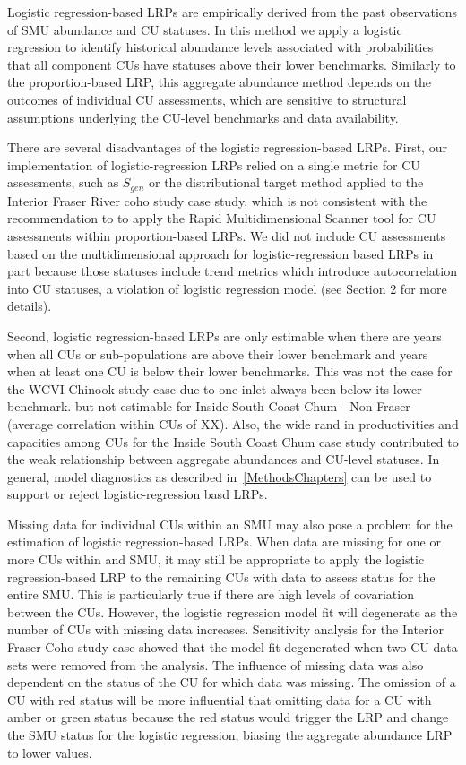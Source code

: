 \documentclass[11pt]{book}
\begin{document}
Logistic regression-based LRPs are empirically derived from the past observations of SMU abundance and CU statuses. In this method we apply a logistic regression to identify historical abundance levels associated with probabilities that all component CUs have statuses above their lower benchmarks. Similarly to the proportion-based LRP, this aggregate abundance method depends on the outcomes of individual CU assessments, which are sensitive to structural assumptions underlying the CU-level benchmarks and data availability.

There are several disadvantages of the logistic regression-based LRPs. First, our implementation of logistic-regression LRPs relied on a single metric for CU assessments, such as \(S_{gen}\) or the distributional target method applied to the Interior Fraser River coho study case study, which is not consistent with the recommendation to to apply the Rapid Multidimensional Scanner tool for CU assessments within proportion-based LRPs. We did not include CU assessments based on the multidimensional approach for logistic-regression based LRPs in part because those statuses include trend metrics which introduce autocorrelation into CU statuses, a violation of logistic regression model (see Section 2 for more details).

Second, logistic regression-based LRPs are only estimable when there are years when all CUs or sub-populations are above their lower benchmark and years when at least one CU is below their lower benchmarks. This was not the case for the WCVI Chinook study case due to one inlet always been below its lower benchmark. but not estimable for Inside South Coast Chum - Non-Fraser (average correlation within CUs of XX). Also, the wide rand in productivities and capacities among CUs for the Inside South Coast Chum case study contributed to the weak relationship between aggregate abundances and CU-level statuses. In general, model diagnostics as described in~\ref{MethodsChapters} can be used to support or reject logistic-regression basd LRPs.

Missing data for individual CUs within an SMU may also pose a problem for the estimation of logistic regression-based LRPs. When data are missing for one or more CUs within and SMU, it may still be appropriate to apply the logistic regression-based LRP to the remaining CUs with data to assess status for the entire SMU. This is particularly true if there are high levels of covariation between the CUs. However, the logistic regression model fit will degenerate as the number of CUs with missing data increases. Sensitivity analysis for the Interior Fraser Coho study case showed that the model fit degenerated when two CU data sets were removed from the analysis. The influence of missing data was also dependent on the status of the CU for which data was missing. The omission of a CU with red status will be more influential that omitting data for a CU with amber or green status because the red status would trigger the LRP and change the SMU status for the logistic regression, biasing the aggregate abundance LRP to lower values.
\end{document}
